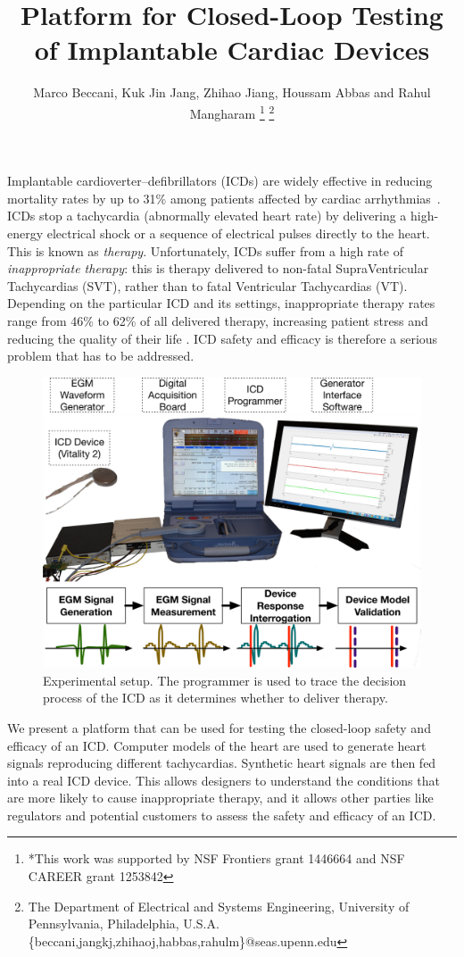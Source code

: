 \documentclass[a4paper, 10pt, conference]{ieeeconf}      %
\title{\LARGE \bf Platform for Closed-Loop Testing of Implantable Cardiac Devices}
\author{ Marco Beccani, Kuk Jin Jang, Zhihao Jiang, Houssam Abbas and Rahul Mangharam%
	\thanks{*This work was supported by NSF Frontiers grant 1446664 and NSF CAREER grant 1253842}%
	\thanks{The Department of Electrical and Systems Engineering, University of Pennsylvania, Philadelphia, U.S.A.
		{\small
			 \{beccani,jangkj,zhihaoj,habbas,rahulm\}@seas.upenn.edu}}%
}
\begin{document}
	
\maketitle
\thispagestyle{empty}
\pagestyle{empty}

Implantable cardioverter–defibrillators (ICDs) are widely effective in reducing mortality rates by up to 31\% among patients affected by cardiac arrhythmias~\cite{Buxton1999}.  
ICDs stop a tachycardia (abnormally elevated heart rate) by delivering a high-energy electrical shock or a sequence of electrical pulses directly to the heart. 
This is known as \emph{therapy}.
Unfortunately, ICDs  suffer from a high rate of \emph{inappropriate therapy}: this is therapy delivered to non-fatal SupraVentricular Tachycardias (SVT), rather than to fatal Ventricular Tachycardias (VT).
Depending on the particular ICD and its settings, inappropriate therapy rates range from 46\% to 62\% of all delivered therapy, increasing patient stress and reducing the quality of their life \cite{shock_mortality}. 
ICD safety and efficacy is therefore a serious problem that has to be addressed.

\begin{figure}[h]
	\centering
	\includegraphics[scale=0.32]{Fig1.png}
	\caption{\small Experimental setup. The programmer is used to trace the decision process of the ICD as it determines whether to deliver therapy.}
	\vspace{-10pt}
	\label{fig:1}
\end{figure}

We present a platform that can be used for testing the closed-loop safety and efficacy of an ICD. 
Computer models of the heart are used to generate heart signals reproducing different tachycardias.
Synthetic heart signals are then fed into a real ICD device.
This allows designers to understand the conditions that are more likely to cause inappropriate therapy, and it allows other parties like regulators and potential customers to assess the safety and efficacy of an ICD.
\end{document}
